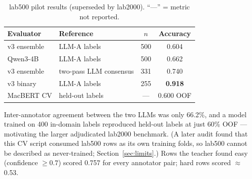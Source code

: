 \documentclass[11pt,a4paper]{article}
\begin{document}
\begin{table}[H]
\centering\small
\caption{lab500 pilot results (superseded by lab2000).
``---'' = metric not reported.}
\label{tab:lab500-app}
\begin{tabular}{llcc}
\toprule
Evaluator & Reference & $n$ & Accuracy \\
\midrule
v3 ensemble      & LLM-A labels      & 500 & 0.604 \\
Qwen3-4B         & LLM-A labels      & 500 & 0.662 \\
v3 ensemble      & two-pass LLM consensus & 331 & 0.740 \\
v3 binary        & LLM-A labels      & 255 & \textbf{0.918} \\
MacBERT CV       & held-out labels    & --- & 0.600 OOF \\
\bottomrule
\end{tabular}
\end{table}

Inter-annotator agreement between the two LLMs was only 66.2\%, and a
model trained on 400 in-domain labels reproduced held-out labels at
just 60\% OOF --- motivating the larger adjudicated lab2000 benchmark.
(A later audit found that this CV script consumed lab500 rows as its
own training folds, so lab500 cannot be described as never-trained;
Section~\ref{sec:limits}.)
Rows the teacher found easy (confidence $\ge 0.7$) scored 0.757 for
every annotator pair; hard rows scored $\approx$0.53.
\end{document}
